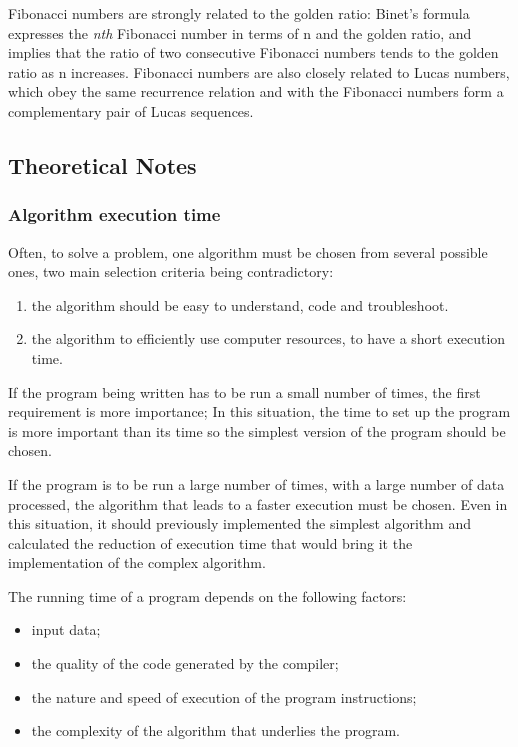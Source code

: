 \documentclass[a4paper, 12pt]{article}
\begin{document}
Fibonacci numbers are strongly related to the golden ratio: 
Binet's formula expresses the \textit{nth} Fibonacci number in terms 
of n and the golden ratio, and implies that the ratio of two 
consecutive Fibonacci numbers tends to the golden ratio as n 
increases. Fibonacci numbers are also closely related to Lucas 
numbers, which obey the same recurrence relation and with the
Fibonacci numbers form a complementary pair of Lucas sequences.
\subsection{Theoretical Notes}

\subsubsection{Algorithm execution time}

Often, to solve a problem, one algorithm must be chosen from several possible ones,
two main selection criteria being contradictory:

\begin{enumerate}
  \item the algorithm should be easy to understand, code and troubleshoot.
  \item the algorithm to efficiently use computer resources, to have a short execution time.
\end{enumerate}

If the program being written has to be run a small number of times, the first requirement is more
importance; In this situation, the time to set up the program is more important than its time
so the simplest version of the program should be chosen.

If the program is to be run a large number of times, with a large number of data
processed, the algorithm that leads to a faster execution must be chosen. Even in this situation, it should
previously implemented the simplest algorithm and calculated the reduction of execution time that would
bring it the implementation of the complex algorithm.

The running time of a program depends on the following factors:

\begin{itemize}
  \item input data;
  \item the quality of the code generated by the compiler;
  \item the nature and speed of execution of the program instructions;
  \item the complexity of the algorithm that underlies the program.
\end{itemize}
\end{document}
